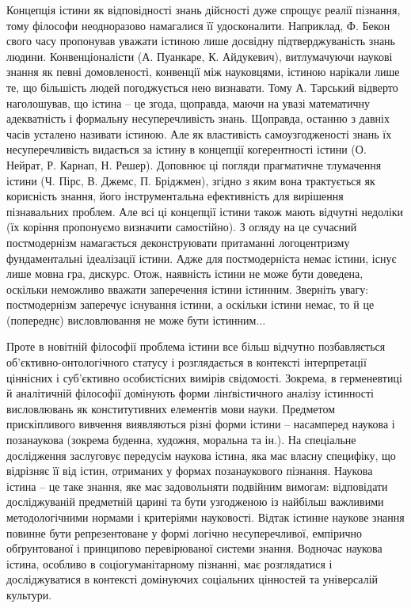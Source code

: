 Концепція істини як відповідності знань дійсності дуже спрощує реалії
пізнання, тому філософи неодноразово намагалися її удосконалити. Наприклад,
Ф. Бекон свого часу пропонував уважати істиною лише досвідну
підтверджуваність знань людини. Конвенціоналісти (А. Пуанкаре, К.
Айдукевич), витлумачуючи наукові знання як певні домовленості, конвенції
між науковцями, істиною нарікали лише те, що більшість людей погоджується
нею визнавати. Тому А. Тарський відверто наголошував, що істина – це згода,
щоправда, маючи на увазі математичну адекватність і формальну
несуперечливість знань. Щоправда, останню з давніх часів усталено називати
істиною. Але як властивість самоузгодженості знань їх несуперечливість
видається за істину в концепції когерентності істини (О. Нейрат, Р. Карнап, Н.
Решер). Доповнює ці погляди прагматичне тлумачення істини (Ч. Пірс, В.
Джемс, П. Бріджмен), згідно з яким вона трактується як корисність знання, його
інструментальна ефективність для вирішення пізнавальних проблем. Але всі ці
концепції істини також мають відчутні недоліки (їх коріння пропонуємо
визначити самостійно). З огляду на це сучасний постмодернізм намагається
деконструювати притаманні логоцентризму фундаментальні ідеалізації істини.
Адже для постмодерніста немає істини, існує лише мовна гра, дискурс. Отож,
наявність істини не може бути доведена, оскільки неможливо вважати
заперечення істини істинним. Зверніть увагу: постмодернізм заперечує
існування істини, а оскільки істини немає, то й це (попереднє) висловлювання
не може бути істинним...

Проте в новітній філософії проблема істини все більш відчутно
позбавляється об’єк\-тивно-онтологічного статусу і розглядається в контексті
інтерпретації ціннісних і суб’єк\-тивно особистісних вимірів свідомості.
Зокрема, в герменевтиці й аналітичній філософії домінують форми
лінґвістичного аналізу істинності висловлювань як конститутивних елементів
мови науки. Предметом прискіпливого вивчення виявляються різні форми
істини – насамперед наукова і позанаукова (зокрема буденна, художня,
моральна та ін.). На спеціальне дослідження заслуговує передусім наукова
істина, яка має власну специфіку, що відрізняє її від істин, отриманих у формах
позанаукового пізнання. Наукова істина – це таке знання, яке має задовольняти
подвійним вимогам: відповідати досліджуваній предметній царині та бути
узгодженою із найбільш важливими методологічними нормами і критеріями
науковості. Відтак істинне наукове знання повинне бути репрезентоване у
формі логічно несуперечливої, емпірично обґрунтованої і принципово
перевірюваної системи знання. Водночас наукова істина, особливо в
соціогуманітарному пізнанні, має розглядатися і досліджуватися в контексті
домінуючих соціальних цінностей та універсалій культури.

